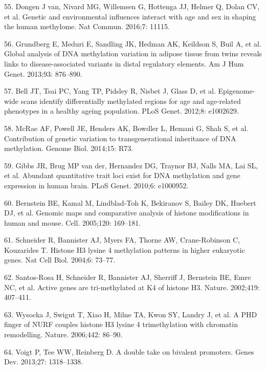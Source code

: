 \documentclass[10pt,letterpaper]{article}
\newenvironment{cslreferences}%
  {}%
  {\par}
\begin{document}
\begin{cslreferences}
\leavevmode\hypertarget{ref-pmid27051996}{}%
55. Dongen J van, Nivard MG, Willemsen G, Hottenga JJ, Helmer Q, Dolan
CV, et al. Genetic and environmental influences interact with age and
sex in shaping the human methylome. Nat Commun. 2016;7: 11115.

\leavevmode\hypertarget{ref-pmid24183450}{}%
56. Grundberg E, Meduri E, Sandling JK, Hedman AK, Keildson S, Buil A,
et al. Global analysis of DNA methylation variation in adipose tissue
from twins reveals links to disease-associated variants in distal
regulatory elements. Am J Hum Genet. 2013;93: 876--890.

\leavevmode\hypertarget{ref-pmid22532803}{}%
57. Bell JT, Tsai PC, Yang TP, Pidsley R, Nisbet J, Glass D, et al.
Epigenome-wide scans identify differentially methylated regions for age
and age-related phenotypes in a healthy ageing population. PLoS Genet.
2012;8: e1002629.

\leavevmode\hypertarget{ref-pmid24887635}{}%
58. McRae AF, Powell JE, Henders AK, Bowdler L, Hemani G, Shah S, et al.
Contribution of genetic variation to transgenerational inheritance of
DNA methylation. Genome Biol. 2014;15: R73.

\leavevmode\hypertarget{ref-pmid20485568}{}%
59. Gibbs JR, Brug MP van der, Hernandez DG, Traynor BJ, Nalls MA, Lai
SL, et al. Abundant quantitative trait loci exist for DNA methylation
and gene expression in human brain. PLoS Genet. 2010;6: e1000952.

\leavevmode\hypertarget{ref-pmid15680324}{}%
60. Bernstein BE, Kamal M, Lindblad-Toh K, Bekiranov S, Bailey DK,
Huebert DJ, et al. Genomic maps and comparative analysis of histone
modifications in human and mouse. Cell. 2005;120: 169--181.

\leavevmode\hypertarget{ref-pmid14661024}{}%
61. Schneider R, Bannister AJ, Myers FA, Thorne AW, Crane-Robinson C,
Kouzarides T. Histone H3 lysine 4 methylation patterns in higher
eukaryotic genes. Nat Cell Biol. 2004;6: 73--77.

\leavevmode\hypertarget{ref-pmid12353038}{}%
62. Santos-Rosa H, Schneider R, Bannister AJ, Sherriff J, Bernstein BE,
Emre NC, et al. Active genes are tri-methylated at K4 of histone H3.
Nature. 2002;419: 407--411.

\leavevmode\hypertarget{ref-pmid16728976}{}%
63. Wysocka J, Swigut T, Xiao H, Milne TA, Kwon SY, Landry J, et al. A
PHD finger of NURF couples histone H3 lysine 4 trimethylation with
chromatin remodelling. Nature. 2006;442: 86--90.

\leavevmode\hypertarget{ref-pmid23788621}{}%
64. Voigt P, Tee WW, Reinberg D. A double take on bivalent promoters.
Genes Dev. 2013;27: 1318--1338.


\end{cslreferences}
\end{document}

